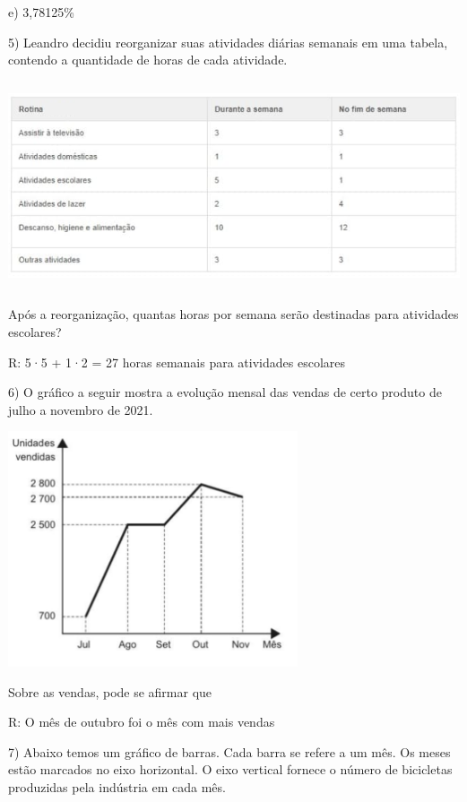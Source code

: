 e) 3,78125\%

5) Leandro decidiu reorganizar suas atividades diárias semanais em uma
tabela, contendo a quantidade de horas de cada atividade.

\includegraphics[width=5.90556in,height=2.41638in]{./imgSAEB_6_MAT/media/image83.png}

Após a reorganização, quantas horas por semana serão destinadas para
atividades escolares?

R: 5·5 + 1·2 = 27 horas semanais para atividades escolares

6) O gráfico a seguir mostra a evolução mensal das vendas de certo
produto de julho a novembro de 2021.

\includegraphics[width=3.36458in,height=2.73558in]{./imgSAEB_6_MAT/media/image84.png}

Sobre as vendas, pode se afirmar que

R: O mês de outubro foi o mês com mais vendas

7) Abaixo temos um gráfico de barras. Cada barra se refere a um mês. Os
meses estão marcados no eixo horizontal. O eixo vertical fornece o
número de bicicletas produzidas pela indústria em cada mês.

